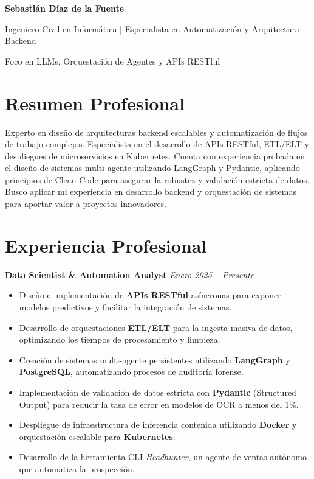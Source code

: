 \documentclass[a4paper, 10pt]{article}
\begin{document}
\begin{center}
    \textbf{\Large Sebastián Díaz de la Fuente}
    
    \vspace{0.2cm}
    {\small Ingeniero Civil en Informática | Especialista en Automatización y Arquitectura Backend}
    
    \vspace{0.4cm}
    {\footnotesize Foco en LLMs, Orquestación de Agentes y APIs RESTful}
\end{center}

\vspace{0.3cm}

\section*{Resumen Profesional}
Experto en diseño de arquitecturas backend escalables y automatización de flujos de trabajo complejos. Especialista en el desarrollo de APIs RESTful, ETL/ELT y despliegues de microservicios en Kubernetes. Cuenta con experiencia probada en el diseño de sistemas multi-agente utilizando LangGraph y Pydantic, aplicando principios de Clean Code para asegurar la robustez y validación estricta de datos. Busco aplicar mi experiencia en desarrollo backend y orquestación de sistemas para aportar valor a proyectos innovadores.

\vspace{0.3cm}

\section*{Experiencia Profesional}

\textbf{Data Scientist \& Automation Analyst} \hfill \textit{Enero 2025 -- Presente}
\begin{itemize}[noitemsep, leftmargin=*]
    \item Diseño e implementación de \textbf{APIs RESTful} asíncronas para exponer modelos predictivos y facilitar la integración de sistemas.
    \item Desarrollo de orquestaciones \textbf{ETL/ELT} para la ingesta masiva de datos, optimizando los tiempos de procesamiento y limpieza.
    \item Creación de sistemas multi-agente persistentes utilizando \textbf{LangGraph} y \textbf{PostgreSQL}, automatizando procesos de auditoría forense.
    \item Implementación de validación de datos estricta con \textbf{Pydantic} (Structured Output) para reducir la tasa de error en modelos de OCR a menos del 1\%.
    \item Despliegue de infraestructura de inferencia contenida utilizando \textbf{Docker} y orquestación escalable para \textbf{Kubernetes}.
    \item Desarrollo de la herramienta CLI \textit{Headhunter}, un agente de ventas autónomo que automatiza la prospección.
\end{itemize}
\end{document}
